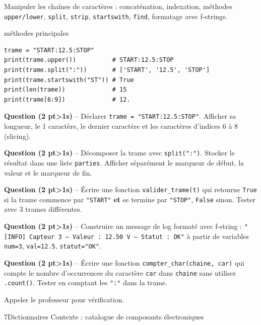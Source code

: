 \documentclass[11pt,a4paper]{article}
\newcommand{\cadreblanc}[1]{%
  \medskip\framebox[\linewidth][c]{\rule{0mm}{#1mm}}\par\medskip}
\newcounter{qnum}
\newcommand{\resetq}{\setcounter{qnum}{0}}
\newcommand{\q}[2]{%
  \stepcounter{qnum}%
  \noindent\textbf{Question \theqnum{} \normalfont(#2 pt\ifnum#2>1s\fi)} -- #1\par\smallskip}
\begin{document}
\begin{objectifbox}{}
  Manipuler les chaînes de caractères : concaténation, indexation, méthodes \texttt{upper/lower}, \texttt{split}, \texttt{strip}, \texttt{startswith}, \texttt{find}, formatage avec f-strings.
\end{objectifbox}

\begin{codebox}{méthodes principales}
\begin{lstlisting}
trame = "START:12.5:STOP"
print(trame.upper())          # START:12.5:STOP
print(trame.split(":"))       # ['START', '12.5', 'STOP']
print(trame.startswith("ST")) # True
print(len(trame))             # 15
print(trame[6:9])             # 12.
\end{lstlisting}
\end{codebox}

\q{Déclarer \texttt{trame = "START:12.5:STOP"}. Afficher sa longueur, le 1\ier{} caractère, le dernier caractère et les caractères d'indices 6 à 8 (slicing).}{2}
\cadreblanc{20}

\q{Décomposer la trame avec \texttt{split(":")}. Stocker le résultat dans une liste \texttt{parties}. Afficher séparément le marqueur de début, la valeur et le marqueur de fin.}{2}
\cadreblanc{22}

\q{Écrire une fonction \texttt{valider\_trame(t)} qui retourne \texttt{True} si la trame commence par \texttt{"START"} \textbf{et} se termine par \texttt{"STOP"}, \texttt{False} sinon. Tester avec 3 trames différentes.}{2}
\cadreblanc{24}

\q{Construire un message de log formaté avec f-string :
\texttt{"[INFO] Capteur 3 -- Valeur : 12.50 V -- Statut : OK"}
à partir de variables \texttt{num=3}, \texttt{val=12.5}, \texttt{statut="OK"}.}{2}
\cadreblanc{20}

\q{Écrire une fonction \texttt{compter\_char(chaine, car)} qui compte le nombre d'occurrences du caractère \texttt{car} dans \texttt{chaine} sans utiliser \texttt{.count()}. Tester en comptant les \texttt{":"} dans la trame.}{2}
\cadreblanc{24}

\begin{appelbox}
  \centering Appeler le professeur pour vérification.
\end{appelbox}

\clearpage
\resetq
\begin{tptitre}{7}{Dictionnaires}
  Contexte : catalogue de composants électroniques
\end{tptitre}
\end{document}
